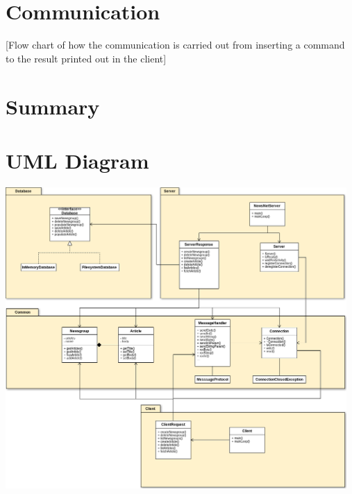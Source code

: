 \documentclass[a4paper, titlepage]{article}
\begin{document}
\section{Communication}\label{communication}
[Flow chart of how the communication is carried out from inserting a command to the result printed out in the client]

\section{Summary}\label{summary}

\newpage
\appendix
\section{UML Diagram}\label{App:AppendixA}
\includegraphics[width=130mm]{NewsNet_UML.png}
\end{document}

